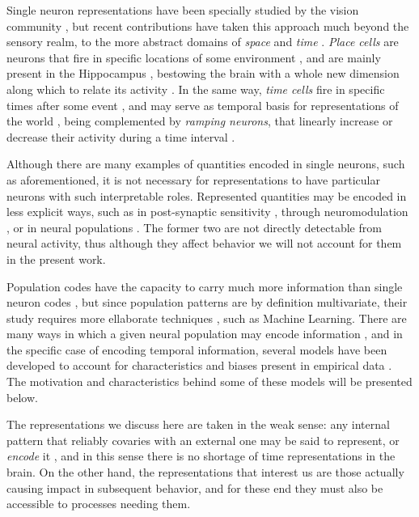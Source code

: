 Single neuron representations have been specially studied by the vision community \cite{deyoe1988concurrent,bell1997independent,ito2004representation,lee2008sparse}, but recent contributions have taken this approach much beyond the sensory realm, to the more abstract domains of \textit{space} and \textit{time} \cite{eichenbaum2014time}. \textit{Place cells} are neurons that fire in specific locations of some environment \cite{foster2006reverse}, and are mainly present in the Hippocampus \cite{o1979review}, bestowing the brain with a whole new dimension along which to relate its activity \cite{eichenbaum2014time}. In the same way, \textit{time cells} fire in specific times after some event \cite{tiganj2016sequential, eichenbaum2014time}, and may serve as temporal basis for representations of the world \cite{ludvig2008stimulus}, being complemented by \textit{ramping neurons}, that linearly increase or decrease their activity during a time interval \cite{morrison2009convergence, kim2013neural, tiganj2016sequential, parker2016timing}.

Although there are many examples of quantities encoded in single neurons, such as aforementioned, it is not necessary for representations to have particular neurons with such interpretable roles. Represented quantities may be encoded in less explicit ways, such as in post-synaptic sensitivity \cite{motanis2018short}, through neuromodulation \cite{friston2009free, friston2010free}, or in neural populations \cite{shamir2014emerging, quiroga2009extracting}. The former two are not directly detectable from neural activity, thus although they affect behavior \cite{wolff2017dynamic} we will not account for them in the present work.

Population codes have the capacity to carry much more information than single neuron codes \cite{hardy2016neurocomputational}, but since population patterns are by definition multivariate, their study requires more ellaborate techniques \cite{quiroga2009extracting}, such as Machine Learning. There are many ways in which a given neural population may encode information \cite{quiroga2009extracting, shamir2014emerging, mello2015scalable}, and in the specific case of encoding temporal information, several models have been developed to account for characteristics and biases present in empirical data \cite{hardy2016neurocomputational}. The motivation and characteristics behind some of these models will be presented below.

The representations we discuss here are taken in the weak sense: any internal pattern that reliably covaries with an external one may be said to represent, or \textit{encode} it \cite{rosch1991embodied}, and in this sense there is no shortage of time representations in the brain. On the other hand, the representations that interest us are those actually causing impact in subsequent behavior, and for these end they must also be accessible to processes needing them.
